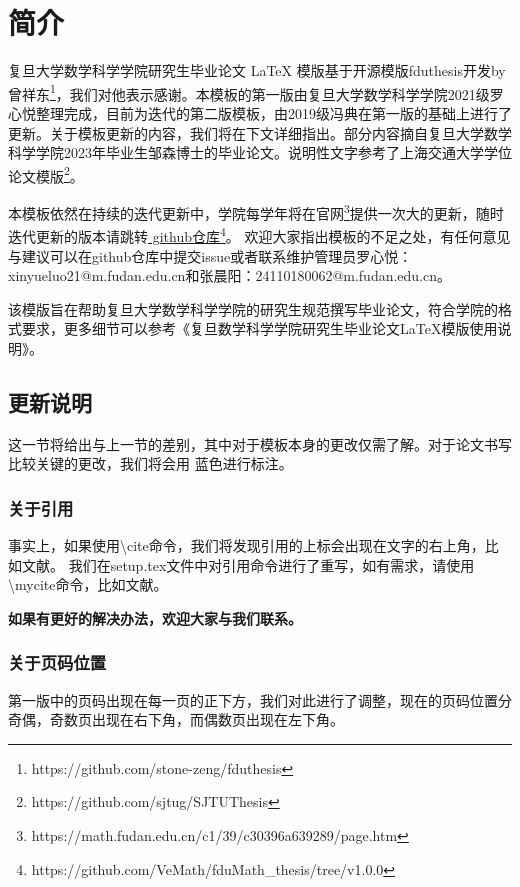 \chapter{简介}
复旦大学数学科学学院研究生毕业论文 LaTeX 模版基于开源模版fduthesis开发by 曾祥东\footnote{https://github.com/stone-zeng/fduthesis}，我们对他表示感谢。本模板的第一版由复旦大学数学科学学院2021级罗心悦整理完成，目前为迭代的第二版模板，由2019级冯典在第一版的基础上进行了更新。关于模板更新的内容，我们将在下文详细指出。部分内容摘自复旦大学数学科学学院2023年毕业生邹森博士的毕业论文。说明性文字参考了上海交通大学学位论文模版\footnote{https://github.com/sjtug/SJTUThesis}。 

本模板依然在持续的迭代更新中，学院每学年将在官网\footnote{https://math.fudan.edu.cn/c1/39/c30396a639289/page.htm}提供一次大的更新，随时迭代更新的版本请跳转\href{https://github.com/VeMath/fduMath_thesis/tree/v1.0.0}{{\color{red} github仓库}}\footnote{https://github.com/VeMath/fduMath\_thesis/tree/v1.0.0}。
欢迎大家指出模板的不足之处，有任何意见与建议可以在github仓库中提交issue或者联系维护管理员罗心悦：xinyueluo21@m.fudan.edu.cn和张晨阳：24110180062@m.fudan.edu.cn。


该模版旨在帮助复旦大学数学科学学院的研究生规范撰写毕业论文，符合学院的格式要求，更多细节可以参考《复旦数学科学学院研究生毕业论文\LaTeX{}模版使用说明》。

\section{更新说明}
这一节将给出与上一节的差别，其中对于模板本身的更改仅需了解。对于论文书写比较关键的更改，我们将会用{\color{blue} 蓝色}进行标注。
\subsection{关于引用}

事实上，如果使用\textbackslash cite命令，我们将发现引用的上标会出现在文字的右上角，比如文献\cite{ChenPDE}。{\color{blue} 我们在setup.tex文件中对引用命令进行了重写，如有需求，请使用\textbackslash mycite命令，比如文献。}

\textbf{如果有更好的解决办法，欢迎大家与我们联系。}

\subsection{关于页码位置}

第一版中的页码出现在每一页的正下方，我们对此进行了调整，现在的页码位置分奇偶，奇数页出现在右下角，而偶数页出现在左下角。

